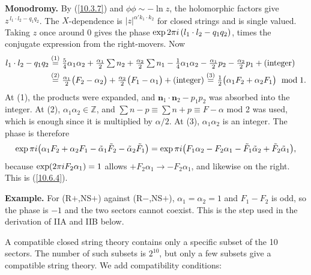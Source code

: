 \begin{tcolorbox}[breakable]
\begin{remark}
			\textbf{Monodromy.} By (\ref{10.3.7}) and $\phi\phi\sim-\ln z$, the holomorphic factors give $z^{\,l_1\cdot l_2-q_1q_2}$. The $X$-dependence is $|z|^{\alpha'k_1\cdot k_2}$ for closed strings and is single valued. Taking $z$ once around $0$ gives the phase $\exp 2\pi i\,(l_1\cdot l_2-q_1q_2)$, times the conjugate expression from the right-movers. Now
			\begin{align*}
				l_1\cdot l_2-q_1q_2&\eqs{1}\tfrac54\alpha_1\alpha_2+\tfrac{\alpha_1}{2}\textstyle\sum n_2+\tfrac{\alpha_2}{2}\sum n_1-\tfrac14\alpha_1\alpha_2-\tfrac{\alpha_1}{2}p_2-\tfrac{\alpha_2}{2}p_1+(\text{integer})\\
				&\eqs{2}\tfrac{\alpha_1}{2}\bigl(F_2-\alpha_2\bigr)+\tfrac{\alpha_2}{2}\bigl(F_1-\alpha_1\bigr)+(\text{integer})
				\eqs{3}\tfrac12\bigl(\alpha_1F_2+\alpha_2F_1\bigr)\ \bmod 1 .
			\end{align*}
			At (1), the products were expanded, and $\mathbf n_1\cdot\mathbf n_2-p_1p_2$ was absorbed into the integer. At (2), $\alpha_1\alpha_2\in\mathds Z$, and $\sum n-p\equiv\sum n+p\equiv F-\alpha$ mod 2 was used, which is enough since it is multiplied by $\alpha/2$. At (3), $\alpha_1\alpha_2$ is an integer. The phase is therefore
			\begin{equation*}
				\exp\pi i\bigl(\alpha_1F_2+\alpha_2F_1-\tilde\alpha_1\tilde F_2-\tilde\alpha_2\tilde F_1\bigr)
				=\exp\pi i\bigl(F_1\alpha_2-F_2\alpha_1-\tilde F_1\tilde\alpha_2+\tilde F_2\tilde\alpha_1\bigr),
			\end{equation*}
			because $\exp(2\pi i F_2\alpha_1)=1$ allows $+F_2\alpha_1\to-F_2\alpha_1$, and likewise on the right. This is (\ref{10.6.4}).

			\textbf{Example.} For (R$+$,NS$+$) against (R$-$,NS$+$), $\alpha_1=\alpha_2=1$ and $F_1-F_2$ is odd, so the phase is $-1$ and the two sectors cannot coexist. This is the step used in the derivation of IIA and IIB below.
		\end{remark}
	\end{tcolorbox}
	
	A compatible closed string theory contains only a specific subset of the 10 sectors. The number of such subsets is $2^{10}$, but only a few subsets give a compatible string theory. We add compatibility conditions:
	
